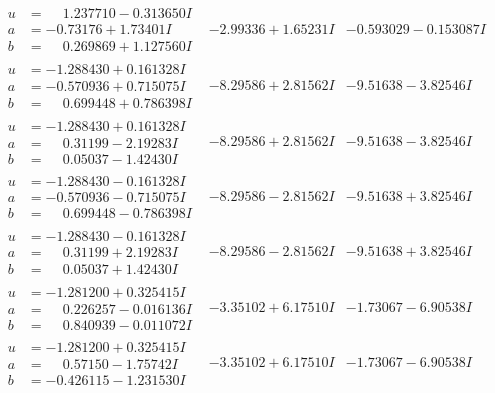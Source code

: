 \documentclass[1p]{elsarticle_modified}
\theoremstyle{definition}
\begin{document}
$$\begin{array}{c|c|c}
\begin{aligned}
u &= \phantom{-}1.237710 - 0.313650 I \\
a &= -0.73176 + 1.73401 I \\
b &= \phantom{-}0.269869 + 1.127560 I\end{aligned}
 & -2.99336 + 1.65231 I & -0.593029 - 0.153087 I \\ \hline\begin{aligned}
u &= -1.288430 + 0.161328 I \\
a &= -0.570936 + 0.715075 I \\
b &= \phantom{-}0.699448 + 0.786398 I\end{aligned}
 & -8.29586 + 2.81562 I & -9.51638 - 3.82546 I \\ \hline\begin{aligned}
u &= -1.288430 + 0.161328 I \\
a &= \phantom{-}0.31199 - 2.19283 I \\
b &= \phantom{-}0.05037 - 1.42430 I\end{aligned}
 & -8.29586 + 2.81562 I & -9.51638 - 3.82546 I \\ \hline\begin{aligned}
u &= -1.288430 - 0.161328 I \\
a &= -0.570936 - 0.715075 I \\
b &= \phantom{-}0.699448 - 0.786398 I\end{aligned}
 & -8.29586 - 2.81562 I & -9.51638 + 3.82546 I \\ \hline\begin{aligned}
u &= -1.288430 - 0.161328 I \\
a &= \phantom{-}0.31199 + 2.19283 I \\
b &= \phantom{-}0.05037 + 1.42430 I\end{aligned}
 & -8.29586 - 2.81562 I & -9.51638 + 3.82546 I \\ \hline\begin{aligned}
u &= -1.281200 + 0.325415 I \\
a &= \phantom{-}0.226257 - 0.016136 I \\
b &= \phantom{-}0.840939 - 0.011072 I\end{aligned}
 & -3.35102 + 6.17510 I & -1.73067 - 6.90538 I \\ \hline\begin{aligned}
u &= -1.281200 + 0.325415 I \\
a &= \phantom{-}0.57150 - 1.75742 I \\
b &= -0.426115 - 1.231530 I\end{aligned}
 & -3.35102 + 6.17510 I & -1.73067 - 6.90538 I \\ \hline\begin{aligned}

\end{aligned}
\end{array}$$
\end{document}
